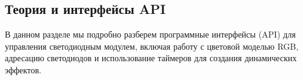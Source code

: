 \subsection{Теория и интерфейсы API}

В данном разделе мы подробно разберем программные интерфейсы (API) для управления светодиодным модулем, включая работу с цветовой моделью RGB, адресацию светодиодов и использование таймеров для создания динамических эффектов.
